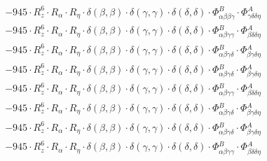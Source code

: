\documentclass{article}
\begin{document}
\begin{subequations}
\begin{gather}
\begin{array}{c}
 \\[0.2em] 		 - 945 \cdot R_{z}^{6} \cdot R_{\alpha{}} \cdot R_{\eta{}} \cdot \delta{}\left(\beta{}, \beta{}\right) \cdot \delta{}\left(\gamma{}, \gamma{}\right) \cdot \delta{}\left(\delta{}, \delta{}\right) \cdot \Phi{}^{B}_{\alpha{}\beta{}\beta{}\gamma{}} \cdot \Phi{}^{A}_{\gamma{}\delta{}\delta{}\eta{}} 
 \\[0.2em] 		 - 945 \cdot R_{z}^{6} \cdot R_{\alpha{}} \cdot R_{\eta{}} \cdot \delta{}\left(\beta{}, \beta{}\right) \cdot \delta{}\left(\gamma{}, \gamma{}\right) \cdot \delta{}\left(\delta{}, \delta{}\right) \cdot \Phi{}^{B}_{\alpha{}\beta{}\gamma{}\gamma{}} \cdot \Phi{}^{A}_{\beta{}\delta{}\delta{}\eta{}} 
 \\[0.2em] 		 - 945 \cdot R_{z}^{6} \cdot R_{\alpha{}} \cdot R_{\eta{}} \cdot \delta{}\left(\beta{}, \beta{}\right) \cdot \delta{}\left(\gamma{}, \gamma{}\right) \cdot \delta{}\left(\delta{}, \delta{}\right) \cdot \Phi{}^{B}_{\alpha{}\beta{}\gamma{}\delta{}} \cdot \Phi{}^{A}_{\beta{}\gamma{}\delta{}\eta{}} 
 \\[0.2em] 		 - 945 \cdot R_{z}^{6} \cdot R_{\alpha{}} \cdot R_{\eta{}} \cdot \delta{}\left(\beta{}, \beta{}\right) \cdot \delta{}\left(\gamma{}, \gamma{}\right) \cdot \delta{}\left(\delta{}, \delta{}\right) \cdot \Phi{}^{B}_{\alpha{}\beta{}\gamma{}\delta{}} \cdot \Phi{}^{A}_{\beta{}\gamma{}\delta{}\eta{}} 
 \\[0.2em] 		 - 945 \cdot R_{z}^{6} \cdot R_{\alpha{}} \cdot R_{\eta{}} \cdot \delta{}\left(\beta{}, \beta{}\right) \cdot \delta{}\left(\gamma{}, \gamma{}\right) \cdot \delta{}\left(\delta{}, \delta{}\right) \cdot \Phi{}^{B}_{\alpha{}\beta{}\gamma{}\gamma{}} \cdot \Phi{}^{A}_{\beta{}\delta{}\delta{}\eta{}} 
 \\[0.2em] 		 - 945 \cdot R_{z}^{6} \cdot R_{\alpha{}} \cdot R_{\eta{}} \cdot \delta{}\left(\beta{}, \beta{}\right) \cdot \delta{}\left(\gamma{}, \gamma{}\right) \cdot \delta{}\left(\delta{}, \delta{}\right) \cdot \Phi{}^{B}_{\alpha{}\beta{}\gamma{}\delta{}} \cdot \Phi{}^{A}_{\beta{}\gamma{}\delta{}\eta{}} 
 \\[0.2em] 		 - 945 \cdot R_{z}^{6} \cdot R_{\alpha{}} \cdot R_{\eta{}} \cdot \delta{}\left(\beta{}, \beta{}\right) \cdot \delta{}\left(\gamma{}, \gamma{}\right) \cdot \delta{}\left(\delta{}, \delta{}\right) \cdot \Phi{}^{B}_{\alpha{}\beta{}\gamma{}\delta{}} \cdot \Phi{}^{A}_{\beta{}\gamma{}\delta{}\eta{}} 
 \\[0.2em] 		 - 945 \cdot R_{z}^{6} \cdot R_{\alpha{}} \cdot R_{\eta{}} \cdot \delta{}\left(\beta{}, \beta{}\right) \cdot \delta{}\left(\gamma{}, \gamma{}\right) \cdot \delta{}\left(\delta{}, \delta{}\right) \cdot \Phi{}^{B}_{\alpha{}\beta{}\gamma{}\gamma{}} \cdot \Phi{}^{A}_{\beta{}\delta{}\delta{}\eta{}} 

\end{array}
\end{gather}
\end{subequations}
\end{document}
